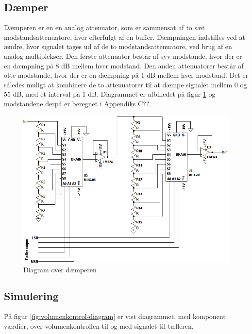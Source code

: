\subsection*{Dæmper}
\label{volumenkontrol-design-daemper}
Dæmperen er en en analog attenuator, som er sammensat af to sæt modstandsattenuatore, hver efterfulgt af en buffer. Dæmpningen indstilles ved at ændre, hvor signalet tages ud af de to modstandsattenuatore, ved brug af en analog multiplekser. Den første attenuator består af syv modstande, hvor der er en dæmpning på 8 dB mellem hver modstand. Den anden attenuatorer består af otte modstande, hvor der er en dæmpning på 1 dB mellem hver modstand. Det er således muligt at kombinere de to attenuatorer til at dæmpe signalet mellem 0 og 55 dB, med et interval på 1 dB. Diagrammet er afbilledet på figur \ref{fig:volumenkontrol_daemper} og modstandene derpå er beregnet i Appendiks C??.

\begin{figure}[h]
\centering
\includegraphics[width=\textwidth]{teknisk/volumenkontrol/daemper.png}
\caption{Diagram over dæmperen}
\label{fig:volumenkontrol_daemper}
\end{figure}

\clearpage
\subsection{Simulering}
\label{volumenkontrol-simulering}

På figur \ref{fig:volumenkontrol-diagram} er vist diagrammet, med komponent værdier, over volumenkontrollen til og med signalet til tælleren.

